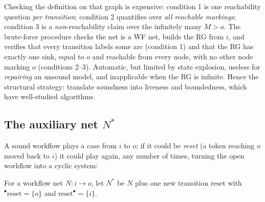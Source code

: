 Checking the definition on that graph is expensive: condition 1 is one reachability question \emph{per transition}; condition 2 quantifies over \emph{all reachable markings}; condition 3 is a \emph{non}-reachability claim over the infinitely many $M > o$. The brute-force procedure checks the net is a WF net, builds the RG from $i$, and verifies that every transition labels some arc (condition 1) and that the RG has exactly one sink, equal to $o$ and reachable from every node, with no other node marking $o$ (conditions 2--3). Automatic, but limited by state explosion, useless for \emph{repairing} an unsound model, and inapplicable when the RG is infinite. Hence the structural strategy: translate soundness into liveness and boundedness, which have well-studied algorithms.

\subsection{The auxiliary net $N^*$}

A sound workflow plays a case from $i$ to $o$; if it could be \emph{reset} (a token reaching $o$ moved back to $i$) it could play again, any number of times, turning the open workflow into a cyclic system:
\begin{center}
\end{center}

\begin{definition}[Closure $N^*$]
For a workflow net $N : i \to o$, let $N^*$ be $N$ plus one new transition $\text{reset}$ with ${}^\bullet\text{reset} = \{o\}$ and $\text{reset}^\bullet = \{i\}$.
\end{definition}

